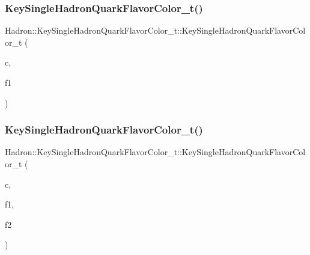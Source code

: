 \subsubsection{\texorpdfstring{KeySingleHadronQuarkFlavorColor\_t()}{KeySingleHadronQuarkFlavorColor\_t()}\hspace{0.1cm}{\footnotesize\ttfamily [12/15]}}
{\footnotesize\ttfamily Hadron\+::\+Key\+Single\+Hadron\+Quark\+Flavor\+Color\+\_\+t\+::\+Key\+Single\+Hadron\+Quark\+Flavor\+Color\+\_\+t (\begin{DoxyParamCaption}\item[{const std\+::string \&}]{c,  }\item[{const \mbox{\hyperlink{structHadron_1_1SingleHadronQuarkFlavor__t}{Single\+Hadron\+Quark\+Flavor\+\_\+t}} \&}]{f1 }\end{DoxyParamCaption})\hspace{0.3cm}{\ttfamily [inline]}}

\mbox{\label{structHadron_1_1KeySingleHadronQuarkFlavorColor__t_a1a1acbb421e0eee78a6102a9dc7027b6}} 
\subsubsection{\texorpdfstring{KeySingleHadronQuarkFlavorColor\_t()}{KeySingleHadronQuarkFlavorColor\_t()}\hspace{0.1cm}{\footnotesize\ttfamily [13/15]}}
{\footnotesize\ttfamily Hadron\+::\+Key\+Single\+Hadron\+Quark\+Flavor\+Color\+\_\+t\+::\+Key\+Single\+Hadron\+Quark\+Flavor\+Color\+\_\+t (\begin{DoxyParamCaption}\item[{const std\+::string \&}]{c,  }\item[{const \mbox{\hyperlink{structHadron_1_1SingleHadronQuarkFlavor__t}{Single\+Hadron\+Quark\+Flavor\+\_\+t}} \&}]{f1,  }\item[{const \mbox{\hyperlink{structHadron_1_1SingleHadronQuarkFlavor__t}{Single\+Hadron\+Quark\+Flavor\+\_\+t}} \&}]{f2 }\end{DoxyParamCaption})\hspace{0.3cm}{\ttfamily [inline]}}

